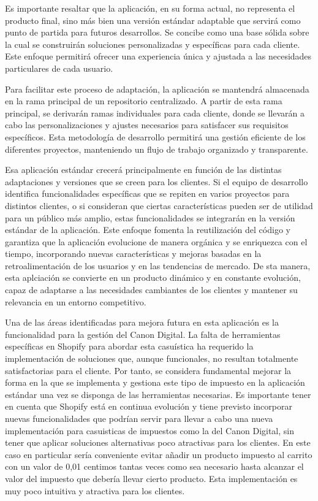 \documentclass[12pt]{article}
\begin{document}
Es importante resaltar que la aplicación, en su forma actual, no representa el producto final, sino más bien una versión estándar adaptable que servirá como punto
de partida para futuros desarrollos. Se concibe como una base sólida sobre la cual se construirán soluciones personalizadas y específicas para cada cliente. Este enfoque
permitirá ofrecer una experiencia única y ajustada a las necesidades particulares de cada usuario.

Para facilitar este proceso de adaptación, la aplicación se mantendrá almacenada en la rama principal de un repositorio centralizado. A partir de esta rama principal,
se derivarán ramas individuales para cada cliente, donde se llevarán a cabo las personalizaciones y ajustes necesarios para satisfacer sus requisitos específicos.
Esta metodología de desarrollo permitirá una gestión eficiente de los diferentes proyectos, manteniendo un flujo de trabajo organizado y transparente.

Esa aplicación estándar crecerá principalmente en función de las distintas adaptaciones y versiones que se creen para los clientes. Si el equipo de desarrollo identifica funcionalidades
específicas que se repiten en varios proyectos para distintos clientes, o si consideran que ciertas características pueden ser de utilidad para un público más amplio, estas
funcionalidades se integrarán en la versión estándar de la aplicación. Este enfoque fomenta la reutilización del código y garantiza que la aplicación evolucione de manera
orgánica y se enriquezca con el tiempo, incorporando nuevas características y mejoras basadas en la retroalimentación de los usuarios y en las tendencias de mercado.
De sta manera, esta aplciación se convierte en un producto dinámico y en constante evolución, capaz de adaptarse a las necesidades cambiantes de los clientes y mantener 
su relevancia en un entorno competitivo.

Una de las áreas identificadas para mejora futura en esta aplicación es la funcionalidad para la gestión del Canon Digital. La falta de herramientas específicas en Shopify
para abordar esta casuística ha requerido la implementación de soluciones que, aunque funcionales, no resultan totalmente satisfactorias para el cliente.
Por tanto, se considera fundamental mejorar la forma en la que se implementa y gestiona este tipo de impuesto en la aplicación estándar una vez se disponga
de las herramientas necesarias. Es importante tener en cuenta que Shopify está en continua evolución y tiene previsto incorporar nuevas funcionalidades que podrían servir
para llevar a cabo una nueva implementación para casuisticas de impuestos como la del Canon Digital, sin tener que aplicar soluciones alternativas poco atractivas para los clientes. En este caso en particular
sería conveniente evitar añadir un producto impuesto al carrito con un valor de 0,01 centimos tantas veces como sea necesario hasta alcanzar el valor del impuesto que debería llevar cierto producto. Esta implementación
es muy poco intuitiva y atractiva para los clientes.
\end{document}
